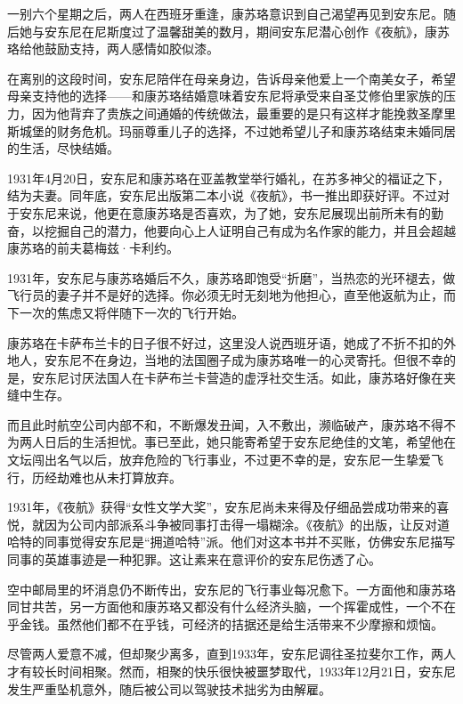 一别六个星期之后，两人在西班牙重逢，康苏珞意识到自己渴望再见到安东尼。随后她与安东尼在尼斯度过了温馨甜美的数月，期间安东尼潜心创作《夜航》，康苏珞给他鼓励支持，两人感情如胶似漆。

在离别的这段时间，安东尼陪伴在母亲身边，告诉母亲他爱上一个南美女子，希望母亲支持他的选择------和康苏珞结婚意味着安东尼将承受来自圣艾修伯里家族的压力，因为他背弃了贵族之间通婚的传统做法，最重要的是只有这样才能挽救圣摩里斯城堡的财务危机。玛丽尊重儿子的选择，不过她希望儿子和康苏珞结束未婚同居的生活，尽快结婚。

1931年4月20日，安东尼和康苏珞在亚盖教堂举行婚礼，在苏多神父的福证之下，结为夫妻。同年底，安东尼出版第二本小说《夜航》，书一推出即获好评。不过对于安东尼来说，他更在意康苏珞是否喜欢，为了她，安东尼展现出前所未有的勤奋，以挖掘自己的潜力，他要向心上人证明自己有成为名作家的能力，并且会超越康苏珞的前夫葛梅兹·卡利约。


\stoptitle

\starttitle[title={11}]

1931年，安东尼与康苏珞婚后不久，康苏珞即饱受“折磨”，当热恋的光环褪去，做飞行员的妻子并不是好的选择。你必须无时无刻地为他担心，直至他返航为止，而下一次的焦虑又将伴随下一次的飞行开始。

康苏珞在卡萨布兰卡的日子很不好过，这里没人说西班牙语，她成了不折不扣的外地人，安东尼不在身边，当地的法国圈子成为康苏珞唯一的心灵寄托。但很不幸的是，安东尼讨厌法国人在卡萨布兰卡营造的虚浮社交生活。如此，康苏珞好像在夹缝中生存。

而且此时航空公司内部不和，不断爆发丑闻，入不敷出，濒临破产，康苏珞不得不为两人日后的生活担忧。事已至此，她只能寄希望于安东尼绝佳的文笔，希望他在文坛闯出名气以后，放弃危险的飞行事业，不过更不幸的是，安东尼一生挚爱飞行，历经劫难也从未打算放弃。

1931年，《夜航》获得“女性文学大奖”，安东尼尚未来得及仔细品尝成功带来的喜悦，就因为公司内部派系斗争被同事打击得一塌糊涂。《夜航》的出版，让反对道哈特的同事觉得安东尼是“拥道哈特”派。他们对这本书并不买账，仿佛安东尼描写同事的英雄事迹是一种犯罪。这让素来在意评价的安东尼伤透了心。

空中邮局里的坏消息仍不断传出，安东尼的飞行事业每况愈下。一方面他和康苏珞同甘共苦，另一方面他和康苏珞又都没有什么经济头脑，一个挥霍成性，一个不在乎金钱。虽然他们都不在乎钱，可经济的拮据还是给生活带来不少摩擦和烦恼。

尽管两人爱意不减，但却聚少离多，直到1933年，安东尼调往圣拉斐尔工作，两人才有较长时间相聚。然而，相聚的快乐很快被噩梦取代，1933年12月21日，安东尼发生严重坠机意外，随后被公司以驾驶技术拙劣为由解雇。

